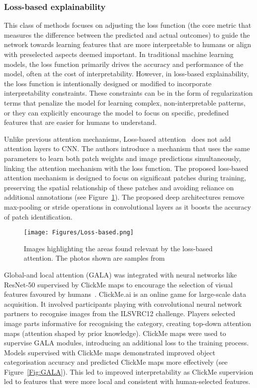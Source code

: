 \subsubsection{Loss-based explainability}

This class of methods focuses on adjusting the loss function (\ie the core metric that measures the difference between the predicted and actual outcomes) to guide the network towards learning features that are more interpretable to humans or align with preselected aspects deemed important. In traditional machine learning models, the loss function primarily drives the accuracy and performance of the model, often at the cost of interpretability. However, in loss-based explainability, the loss function is intentionally designed or modified to incorporate interpretability constraints. These constraints can be in the form of regularization terms that penalize the model for learning complex, non-interpretable patterns, or they can explicitly encourage the model to focus on specific, predefined features that are easier for humans to understand.

Unlike previous attention mechanisms, Loss-based attention~\cite{ShiXXCLLG21} does not add attention layers to CNN. The authors introduce a mechanism that uses the same parameters to learn both patch weights and image predictions simultaneously, linking the attention mechanism with the loss function.  The proposed loss-based attention mechanism is designed to focus on significant patches during training, preserving the spatial relationship of these patches and avoiding reliance on additional annotations (see Figure~\ref{Fig:loss-based}). The proposed deep architectures remove max-pooling or stride operations in convolutional layers as it boosts the accuracy of patch identification.

\begin{figure}[ht!]
	\begin{center}
		\texttt{[image: Figures/Loss-based.png]}
	\end{center}
	\caption{Images highlighting the areas found relevant by the loss-based attention. The photos shown are samples from~\cite{ShiXXCLLG21}}
	\label{Fig:loss-based}
\end{figure} 



Global-and local attention (GALA) was integrated with neural networks like ResNet-50 supervised by ClickMe maps to encourage the selection of visual features favoured by humans~\cite{LinsleySES19}. ClickMe.ai is an online game for large-scale data acquisition. It involved participants playing with convolutional neural network partners to recognise images from the ILSVRC12 challenge. Players selected image parts informative for recognising the category, creating top-down attention maps (\ie attention shaped by prior knowledge). ClickMe maps were used to supervise GALA modules, introducing an additional loss to the training process. Models supervised with ClickMe maps demonstrated improved object categorisation accuracy and predicted ClickMe maps more effectively (see Figure~\ref{Fig:GALA}). This led to improved interpretability as ClickMe supervision led to features that were more local and consistent with human-selected features.

